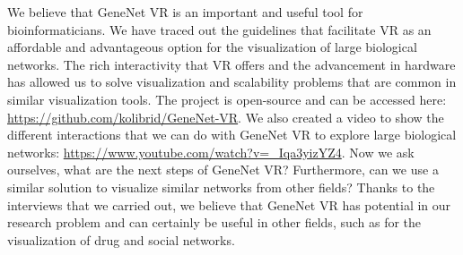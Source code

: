 We believe that GeneNet VR is an important and useful tool for bioinformaticians. We have traced out the guidelines that facilitate VR as an affordable and advantageous option for the visualization of large biological networks. The rich interactivity that VR offers and the advancement in hardware has allowed us to solve visualization and scalability problems that are common in similar visualization tools. The project is open-source and can be accessed here: \url{https://github.com/kolibrid/GeneNet-VR}. We also created a video to show the different interactions that we can do with GeneNet VR to explore large biological networks: \url{https://www.youtube.com/watch?v=\_Iqa3yizYZ4}. Now we ask ourselves, what are the next steps of GeneNet VR? Furthermore, can we use a similar solution to visualize similar networks from other fields? Thanks to the interviews that we carried out, we believe that GeneNet VR has potential in our research problem and can certainly be useful in other fields, such as for the visualization of drug and social networks.
